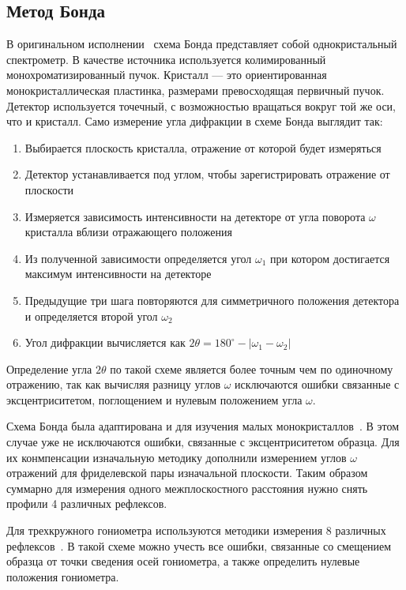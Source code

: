 \documentclass[a4paper, 12pt]{article}
\begin{document}
\subsection{Метод Бонда}
В оригинальном исполнении~\cite{Bond:1960} схема Бонда представляет собой однокристальный спектрометр.
В качестве источника используется колимированный монохроматизированный пучок.
Кристалл --- это ориентированная монокристаллическая пластинка, размерами превосходящая первичный пучок.
Детектор используется точечный, с возможностью вращаться вокруг той же оси, что и кристалл.
Само измерение угла дифракции в схеме Бонда выглядит так:
\begin{enumerate}
    \item Выбирается плоскость кристалла, отражение от которой будет измеряться
    \item Детектор устанавливается под углом, чтобы зарегистрировать отражение от плоскости
    \item Измеряется зависимость интенсивности на детекторе от угла поворота $\omega$ кристалла вблизи отражающего положения
    \item Из полученной зависимости определяется угол $\omega_1$ при котором достигается максимум интенсивности на детекторе
    \item Предыдущие три шага повторяются для симметричного положения детектора и определяется второй угол $\omega_2$
    \item Угол дифракции вычисляется как $2\theta=180^\circ-|\omega_1-\omega_2|$
\end{enumerate}
Определение угла $2\theta$ по такой схеме является более точным чем по одиночному отражению, так как вычисляя разницу углов $\omega$ исключаются ошибки связанные с эксцентриситетом, поглощением и нулевым положением угла $\omega$.

Схема Бонда была адаптирована и для изучения малых монокристаллов~\cite{Hubbard:1976,Ponomarev:1969}.
В этом случае уже не исключаются ошибки, связанные с эксцентриситетом образца.
Для их конмпенсации изначальную методику дополнили измерением углов $\omega$ отражений для фриделевской пары изначальной плоскости.
Таким образом суммарно для измерения одного межплоскостного расстояния нужно снять профили 4 различных рефлексов.

Для трехкружного гониометра используются методики измерения 8 различных рефлексов~\cite{King:1979}.
В такой схеме можно учесть все ошибки, связанные со смещением образца от точки сведения осей гониометра, а также определить нулевые положения гониометра.
\end{document}
